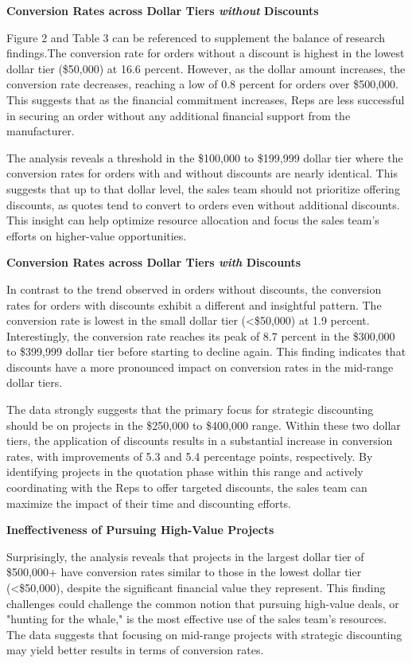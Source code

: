 \documentclass[12pt,english]{article}
\begin{document}
    
\textbf{Conversion Rates across Dollar Tiers \textit{without} Discounts}

Figure 2 and Table 3 can be referenced to supplement the balance of research findings.The conversion rate for orders without a discount is highest in the lowest dollar tier (\<\$50,000) at 16.6 percent. However, as the dollar amount increases, the conversion rate decreases, reaching a low of 0.8 percent for orders over \$500,000. This suggests that as the financial commitment increases, Reps are less successful in securing an order without any additional financial support from the manufacturer.

The analysis reveals a threshold in the \$100,000 to \$199,999 dollar tier where the conversion rates for orders with and without discounts are nearly identical. This suggests that up to that dollar level, the sales team should not prioritize offering discounts, as quotes tend to convert to orders even without additional discounts. This insight can help optimize resource allocation and focus the sales team's efforts on higher-value opportunities.

\textbf{Conversion Rates across Dollar Tiers \textit{with} Discounts}

In contrast to the trend observed in orders without discounts, the conversion rates for orders with discounts exhibit a different and insightful pattern. The conversion rate is lowest in the small dollar tier (<\$50,000) at 1.9 percent. Interestingly, the conversion rate reaches its peak of 8.7 percent in the \$300,000 to \$399,999 dollar tier before starting to decline again. This finding indicates that discounts have a more pronounced impact on conversion rates in the mid-range dollar tiers.

The data strongly suggests that the primary focus for strategic discounting should be on projects in the \$250,000 to \$400,000 range. Within these two dollar tiers, the application of discounts results in a substantial increase in conversion rates, with improvements of 5.3 and 5.4 percentage points, respectively. By identifying projects in the quotation phase within this range and actively coordinating with the Reps to offer targeted discounts, the sales team can maximize the impact of their time and discounting efforts.

\textbf{Ineffectiveness of Pursuing High-Value Projects}

Surprisingly, the analysis reveals that projects in the largest dollar tier of \$500,000+ have conversion rates similar to those in the lowest dollar tier (<\$50,000), despite the significant financial value they represent. This finding challenges could challenge the common notion that pursuing high-value deals, or "hunting for the whale," is the most effective use of the sales team's resources. The data suggests that focusing on mid-range projects with strategic discounting may yield better results in terms of conversion rates.
\end{document}

